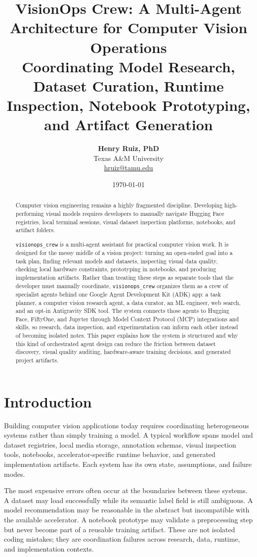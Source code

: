 \documentclass[11pt,a4paper]{article}
\title{\textbf{VisionOps Crew: A Multi-Agent Architecture for Computer Vision Operations}\\[0.75em]
\large Coordinating Model Research, Dataset Curation, Runtime Inspection, Notebook Prototyping, and Artifact Generation}
\author{\textbf{Henry Ruiz, PhD} \\ Texas A\&M University \\ \href{mailto:hruiz@tamu.edu}{hruiz@tamu.edu}}
\date{\today}
\begin{document}
\maketitle

\begin{abstract}
Computer vision engineering remains a highly fragmented discipline. Developing high-performing visual models requires developers to manually navigate Hugging Face registries, local terminal sessions, visual dataset inspection platforms, notebooks, and artifact folders.

\texttt{visionops\_crew} is a multi-agent assistant for practical computer vision work. It is designed for the messy middle of a vision project: turning an open-ended goal into a task plan, finding relevant models and datasets, inspecting visual data quality, checking local hardware constraints, prototyping in notebooks, and producing implementation artifacts. Rather than treating these steps as separate tools that the developer must manually coordinate, \texttt{visionops\_crew} organizes them as a crew of specialist agents behind one Google Agent Development Kit (ADK) app: a task planner, a computer vision research agent, a data curator, an ML engineer, web search, and an opt-in Antigravity SDK tool. The system connects those agents to Hugging Face, FiftyOne, and Jupyter through Model Context Protocol (MCP) integrations and skills, so research, data inspection, and experimentation can inform each other instead of becoming isolated notes. This paper explains how the system is structured and why this kind of orchestrated agent design can reduce the friction between dataset discovery, visual quality auditing, hardware-aware training decisions, and generated project artifacts.
\end{abstract}

\section{Introduction}
Building computer vision applications today requires coordinating heterogeneous systems rather than simply training a model. A typical workflow spans model and dataset registries, local media storage, annotation schemas, visual inspection tools, notebooks, accelerator-specific runtime behavior, and generated implementation artifacts. Each system has its own state, assumptions, and failure modes.

The most expensive errors often occur at the boundaries between these systems. A dataset may load successfully while its semantic label field is still ambiguous. A model recommendation may be reasonable in the abstract but incompatible with the available accelerator. A notebook prototype may validate a preprocessing step but never become part of a reusable training artifact. These are not isolated coding mistakes; they are coordination failures across research, data, runtime, and implementation contexts.
\end{document}
